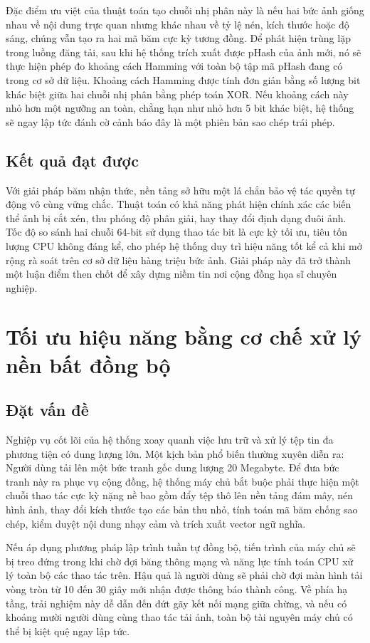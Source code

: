 Đặc điểm ưu việt của thuật toán tạo chuỗi nhị phân này là nếu hai bức ảnh giống nhau về nội dung trực quan nhưng khác nhau về tỷ lệ nén, kích thước hoặc độ sáng, chúng vẫn tạo ra hai mã băm cực kỳ tương đồng. Để phát hiện trùng lặp trong luồng đăng tải, sau khi hệ thống trích xuất được pHash của ảnh mới, nó sẽ thực hiện phép đo khoảng cách Hamming với toàn bộ tập mã pHash đang có trong cơ sở dữ liệu. Khoảng cách Hamming được tính đơn giản bằng số lượng bit khác biệt giữa hai chuỗi nhị phân bằng phép toán XOR. Nếu khoảng cách này nhỏ hơn một ngưỡng an toàn, chẳng hạn như nhỏ hơn 5 bit khác biệt, hệ thống sẽ ngay lập tức đánh cờ cảnh báo đây là một phiên bản sao chép trái phép.

\subsection{Kết quả đạt được}
Với giải pháp băm nhận thức, nền tảng sở hữu một lá chắn bảo vệ tác quyền tự động vô cùng vững chắc. Thuật toán có khả năng phát hiện chính xác các biến thể ảnh bị cắt xén, thu phóng độ phân giải, hay thay đổi định dạng đuôi ảnh. Tốc độ so sánh hai chuỗi 64-bit sử dụng thao tác bit là cực kỳ tối ưu, tiêu tốn lượng CPU không đáng kể, cho phép hệ thống duy trì hiệu năng tốt kể cả khi mở rộng rà soát trên cơ sở dữ liệu hàng triệu bức ảnh. Giải pháp này đã trở thành một luận điểm then chốt để xây dựng niềm tin nơi cộng đồng họa sĩ chuyên nghiệp.


\section{Tối ưu hiệu năng bằng cơ chế xử lý nền bất đồng bộ}

\subsection{Đặt vấn đề}
Nghiệp vụ cốt lõi của hệ thống xoay quanh việc lưu trữ và xử lý tệp tin đa phương tiện có dung lượng lớn. Một kịch bản phổ biến thường xuyên diễn ra: Người dùng tải lên một bức tranh gốc dung lượng 20 Megabyte. Để đưa bức tranh này ra phục vụ cộng đồng, hệ thống máy chủ bắt buộc phải thực hiện một chuỗi thao tác cực kỳ nặng nề bao gồm đẩy tệp thô lên nền tảng đám mây, nén hình ảnh, thay đổi kích thước tạo các bản thu nhỏ, tính toán mã băm chống sao chép, kiểm duyệt nội dung nhạy cảm và trích xuất vector ngữ nghĩa.

Nếu áp dụng phương pháp lập trình tuần tự đồng bộ, tiến trình của máy chủ sẽ bị treo đứng trong khi chờ đợi băng thông mạng và năng lực tính toán CPU xử lý toàn bộ các thao tác trên. Hậu quả là người dùng sẽ phải chờ đợi màn hình tải vòng tròn từ 10 đến 30 giây mới nhận được thông báo thành công. Về phía hạ tầng, trải nghiệm này dễ dẫn đến đứt gãy kết nối mạng giữa chừng, và nếu có khoảng mười người dùng cùng thao tác tải ảnh, toàn bộ tài nguyên máy chủ có thể bị kiệt quệ ngay lập tức.

